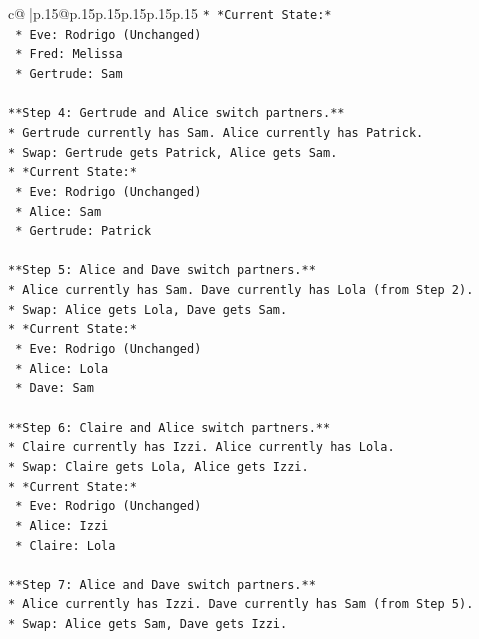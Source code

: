 \documentclass{article}
\begin{document}
{\begin{supertabular}{c@{$\;$}|p{.15\linewidth}@{}p{.15\linewidth}p{.15\linewidth}p{.15\linewidth}p{.15\linewidth}p{.15\linewidth}}
{{{\texttt{*   *Current State:*} \\
\texttt{    *   Eve: Rodrigo (Unchanged)} \\
\texttt{    *   Fred: Melissa} \\
\texttt{    *   Gertrude: Sam} \\
\\ 
\texttt{**Step 4: Gertrude and Alice switch partners.**} \\
\texttt{*   Gertrude currently has Sam. Alice currently has Patrick.} \\
\texttt{*   Swap: Gertrude gets Patrick, Alice gets Sam.} \\
\texttt{*   *Current State:*} \\
\texttt{    *   Eve: Rodrigo (Unchanged)} \\
\texttt{    *   Alice: Sam} \\
\texttt{    *   Gertrude: Patrick} \\
\\ 
\texttt{**Step 5: Alice and Dave switch partners.**} \\
\texttt{*   Alice currently has Sam. Dave currently has Lola (from Step 2).} \\
\texttt{*   Swap: Alice gets Lola, Dave gets Sam.} \\
\texttt{*   *Current State:*} \\
\texttt{    *   Eve: Rodrigo (Unchanged)} \\
\texttt{    *   Alice: Lola} \\
\texttt{    *   Dave: Sam} \\
\\ 
\texttt{**Step 6: Claire and Alice switch partners.**} \\
\texttt{*   Claire currently has Izzi. Alice currently has Lola.} \\
\texttt{*   Swap: Claire gets Lola, Alice gets Izzi.} \\
\texttt{*   *Current State:*} \\
\texttt{    *   Eve: Rodrigo (Unchanged)} \\
\texttt{    *   Alice: Izzi} \\
\texttt{    *   Claire: Lola} \\
\\ 
\texttt{**Step 7: Alice and Dave switch partners.**} \\
\texttt{*   Alice currently has Izzi. Dave currently has Sam (from Step 5).} \\
\texttt{*   Swap: Alice gets Sam, Dave gets Izzi.} \\
}}}
\end{supertabular}}
\end{document}
